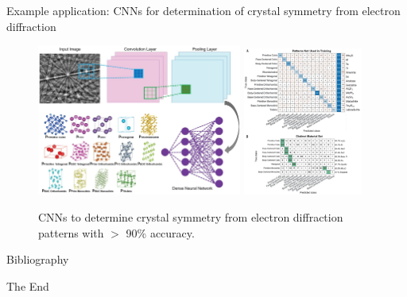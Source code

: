 \documentclass{beamer}
\begin{document}
\begin{frame}{Example application: CNNs for determination of crystal symmetry from electron diffraction}
\begin{figure}
    \centering
    \includegraphics[width=0.6\textwidth]{figures/science-cnn-electron-diffraction.jpg}
    \includegraphics[width=0.35\textwidth]{figures/science-cnn-electron-diffraction2.jpg}
    \caption{CNNs to determine crystal symmetry from electron diffraction patterns with $>$ 90\% accuracy.\cite{kaufmannCrystalSymmetryDetermination2020}}
\end{figure}
\end{frame}


\begin{frame}{Bibliography}
    
    
\end{frame}


\begin{frame}
    \Huge{\centerline{The End}}
\end{frame}
\end{document}
